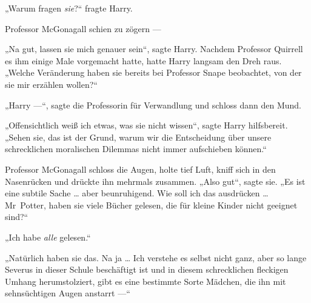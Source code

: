 „Warum fragen \emph{sie}?“ fragte Harry.

Professor McGonagall schien zu zögern —

„Na gut, lassen sie mich genauer sein“, sagte Harry. Nachdem Professor Quirrell es ihm einige Male vorgemacht hatte, hatte Harry langsam den Dreh raus.
„Welche Veränderung haben sie bereits bei Professor Snape beobachtet, von der sie mir erzählen wollen?“

„Harry —“, sagte die Professorin für Verwandlung und schloss dann den Mund.

„Offensichtlich weiß ich etwas, was sie nicht wissen“, sagte Harry hilfsbereit.
„Sehen sie, das ist der Grund, warum wir die Entscheidung über unsere schrecklichen moralischen Dilemmas nicht immer aufschieben können.“

Professor McGonagall schloss die Augen, holte tief Luft, kniff sich in den Nasenrücken und drückte ihn mehrmals zusammen.
„Also gut“, sagte sie.
„Es ist eine subtile Sache … aber beunruhigend. Wie soll ich das ausdrücken … Mr~Potter, haben sie viele Bücher gelesen, die für kleine Kinder nicht geeignet sind?“

„Ich habe \emph{alle} gelesen.“

„Natürlich haben sie das. Na ja … Ich verstehe es selbst nicht ganz, aber so lange Severus in dieser Schule beschäftigt ist und in diesem schrecklichen fleckigen Umhang herumstolziert, gibt es eine bestimmte Sorte Mädchen, die ihn mit sehnsüchtigen Augen anstarrt —“

